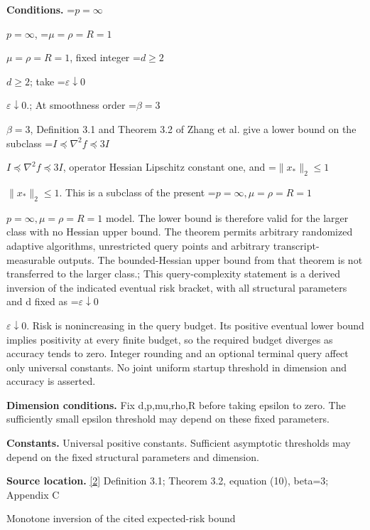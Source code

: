 \documentclass[10pt,a4paper]{article}
\newcommand{\AtlasMath}[1]{\par\begingroup\centering\setbox0=\hbox{$\displaystyle #1$}\ifdim\wd0>1.4\linewidth\typeout{ATLAS WIDE FORMULA: \the\wd0}\fi\ifdim\wd0>\linewidth\resizebox{\linewidth}{!}{\box0}\else\box0\fi\par\endgroup}
\newcommand{\AtlasInlineMath}[1]{\begingroup\setbox0=\hbox{$#1$}\ifdim\wd0>.4\linewidth\endgroup\AtlasMath{#1}\else\endgroup$#1$\fi}
\begin{document}
\textbf{Conditions.} \AtlasInlineMath{p=\infty}, \AtlasInlineMath{\mu=\rho=R=1}, fixed integer \AtlasInlineMath{d\ge2}; take \AtlasInlineMath{\varepsilon\downarrow0}.; At smoothness order \AtlasInlineMath{\beta=3}, Definition 3.1 and Theorem 3.2 of Zhang et al. give a lower bound on the subclass \AtlasInlineMath{I\preceq\nabla^2 f\preceq3I}, operator Hessian Lipschitz constant one, and \AtlasInlineMath{\|x_*\|_2\le1}. This is a subclass of the present \AtlasInlineMath{p=\infty,\mu=\rho=R=1} model. The lower bound is therefore valid for the larger class with no Hessian upper bound. The theorem permits arbitrary randomized adaptive algorithms, unrestricted query points and arbitrary transcript-measurable outputs. The bounded-Hessian upper bound from that theorem is not transferred to the larger class.; This query-complexity statement is a derived inversion of the indicated eventual risk bracket, with all structural parameters and d fixed as \AtlasInlineMath{\varepsilon\downarrow0}. Risk is nonincreasing in the query budget. Its positive eventual lower bound implies positivity at every finite budget, so the required budget diverges as accuracy tends to zero. Integer rounding and an optional terminal query affect only universal constants. No joint uniform startup threshold in dimension and accuracy is asserted.



\textbf{Dimension conditions.} Fix d,p,mu,rho,R before taking epsilon to zero. The sufficiently small epsilon threshold may depend on these fixed parameters.



\textbf{Constants.} Universal positive constants. Sufficient asymptotic thresholds may depend on the fixed structural parameters and dimension.



\textbf{Source location.} \href{https://arxiv.org/html/2610.00276v2}{[2]} Definition 3.1; Theorem 3.2, equation (10), beta=3; Appendix C



Monotone inversion of the cited expected-risk bound
\end{document}
